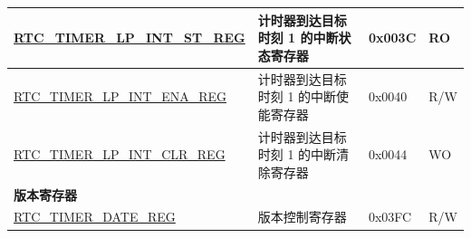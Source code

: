\begin{longtable}{ | p{6cm} | p{7.2cm} | p{1.3cm} | p{1cm} | }
\hyperref[regdesc:RTCTIMERLPINTSTREG]{RTC\_TIMER\_LP\_INT\_ST\_REG} & 计时器到达目标时刻 1 的中断状态寄存器 & 0x003C & RO\\ \hline
\hyperref[regdesc:RTCTIMERLPINTENAREG]{RTC\_TIMER\_LP\_INT\_ENA\_REG} & 计时器到达目标时刻 1 的中断使能寄存器 & 0x0040 & R/W \\ \hline
\hyperref[regdesc:RTCTIMERLPINTCLRREG]{RTC\_TIMER\_LP\_INT\_CLR\_REG} & 计时器到达目标时刻 1 的中断清除寄存器 & 0x0044 & WO \\ \hline
\multicolumn{4}{|l|}{\textbf{版本寄存器}} \\ \hline
\hyperref[regdesc:RTCTIMERDATEREG]{RTC\_TIMER\_DATE\_REG} & 版本控制寄存器 & 0x03FC & R/W \\ \hline
\end{longtable}
